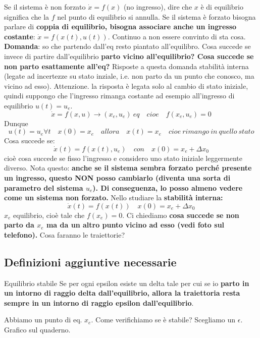 \documentclass[a4paper]{report}
\begin{document}
\bb
Se il sistema è non forzato $\dot x = f(x)$ (no ingresso), dire che $x$ è di equilibrio significa che la $f$ nel punto di equilibrio si annulla. Se il sistema è forzato bisogna parlare di \textbf{coppia di equilibrio, bisogna associare anche un ingresso costante}: $\dot x = f(x(t), u(t)).$ Continuo a non essere convinto di sta cosa.
\bb
\textbf{Domanda}: so che partendo dall'eq resto piantato all'equilibro. Cosa succede se invece di partire dall'equilibrio \textbf{parto vicino all'equilibrio? Cosa succede se non parto esattamente all'eq?}
Risposte a questa domanda \rarr stabilità interna (legate ad incertezze su stato inziale, i.e. non parto da un punto che conosco, ma vicino ad esso).
\bb
Attenzione. la risposta è legata solo al cambio di stato iniziale, quindi suppongo che l'ingresso rimanga costante ad esempio all'ingresso di equilibrio $u(t) = u_e$.
\begin{equation*}
	\dot x=f(x,u) \rightarrow (x_e, u_e) \ eq \quad cioe \quad f(x_e, u_e) = 0
\end{equation*}
Dunque
\begin{equation*}
	u(t) = u_e \forall t \quad x(0) = x_e \quad allora \quad x(t) = x_e \quad cioe \ rimango \ in \ quello \ stato
\end{equation*}
Cosa succede se:
\begin{equation*}
	\dot x(t) = f(x(t), u_e) \quad con \quad x(0)=x_e+\Delta x_0
\end{equation*}
cioè cosa succede se fisso l'ingresso e considero uno stato iniziale leggermente diverso. Nota questo: \textbf{anche se il sistema sembra forzato perché presente un ingresso, questo NON posso cambiarlo (diventa una sorta di parametro del sistema $u_e$). Di conseguenza, lo posso almeno vedere come un sistema non forzato.}
\bb
Nello studiare la \textbf{stabilità interna:}
\begin{equation*}
	\dot x(t) = f(x(t)) \quad x(0) = x_e+\Delta x_0
\end{equation*}
$x_e$ equilibrio, cioè tale che $f(x_e) = 0$. Ci chiediamo \textbf{cosa succede se non parto da $x_e$ ma da un altro punto vicino ad esso (vedi foto sul telefono).} Cosa faranno le traiettorie?

\bb
\subsection{Definizioni aggiuntive necessarie}
\begin{defin}{Equilibrio stabile}{}
	Se per ogni epsilon esiste un delta tale per cui se io \textbf{parto in un intorno di raggio delta dall'equilibrio, allora la traiettoria resta sempre in un intorno di raggio epsilon dall'equilibrio}. 
\end{defin}
Abbiamo un punto di eq. $x_e$. Come verifichiamo se è stabile? Scegliamo un $\epsilon$. Grafico sul quaderno.
\end{document}
